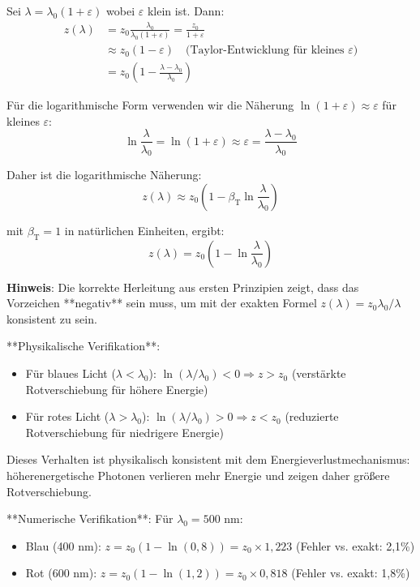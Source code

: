\documentclass[12pt,a4paper]{article}
\newcommand{\betaT}{\beta_{\text{T}}}
\begin{document}
Sei $\lambda = \lambda_0(1 + \varepsilon)$ wobei $\varepsilon$ klein ist. Dann:
\begin{align}
	z(\lambda) &= z_0 \frac{\lambda_0}{\lambda_0(1+\varepsilon)} = \frac{z_0}{1+\varepsilon} \\
	&\approx z_0(1-\varepsilon) \quad \text{(Taylor-Entwicklung für kleines $\varepsilon$)} \\
	&= z_0\left(1 - \frac{\lambda-\lambda_0}{\lambda_0}\right)
\end{align}

Für die logarithmische Form verwenden wir die Näherung $\ln(1+\varepsilon) \approx \varepsilon$ für kleines $\varepsilon$:
\begin{equation}
	\ln\frac{\lambda}{\lambda_0} = \ln(1+\varepsilon) \approx \varepsilon = \frac{\lambda-\lambda_0}{\lambda_0}
\end{equation}

Daher ist die logarithmische Näherung:
\begin{equation}
	\boxed{z(\lambda) \approx z_0\left(1 - \betaT \ln\frac{\lambda}{\lambda_0}\right)}
	\label{eq:corrected_logarithmic_redshift}
\end{equation}

mit $\betaT = 1$ in natürlichen Einheiten, ergibt:
\begin{equation}
	\boxed{z(\lambda) = z_0\left(1 - \ln\frac{\lambda}{\lambda_0}\right)}
\end{equation}

\textbf{Hinweis}: Die korrekte Herleitung aus ersten Prinzipien zeigt, dass das Vorzeichen **negativ** sein muss, um mit der exakten Formel $z(\lambda) = z_0 \lambda_0/\lambda$ konsistent zu sein.

**Physikalische Verifikation**: 
\begin{itemize}
	\item Für blaues Licht ($\lambda < \lambda_0$): $\ln(\lambda/\lambda_0) < 0 \Rightarrow z > z_0$ (verstärkte Rotverschiebung für höhere Energie)
	\item Für rotes Licht ($\lambda > \lambda_0$): $\ln(\lambda/\lambda_0) > 0 \Rightarrow z < z_0$ (reduzierte Rotverschiebung für niedrigere Energie)
\end{itemize}

Dieses Verhalten ist physikalisch konsistent mit dem Energieverlustmechanismus: höherenergetische Photonen verlieren mehr Energie und zeigen daher größere Rotverschiebung.

**Numerische Verifikation**: Für $\lambda_0 = 500$ nm:
\begin{itemize}
	\item Blau (400 nm): $z = z_0(1 - \ln(0,8)) = z_0 \times 1,223$ (Fehler vs. exakt: 2,1\%)
	\item Rot (600 nm): $z = z_0(1 - \ln(1,2)) = z_0 \times 0,818$ (Fehler vs. exakt: 1,8\%)
\end{itemize}
\end{document}
